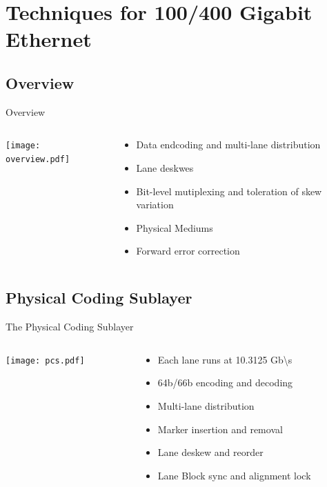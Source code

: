 \documentclass[fleqn,11pt,aspectratio=169]{beamer}
\begin{document}
\section{Techniques for 100/400 Gigabit Ethernet}
\subsection{Overview}
\begin{frame}{Overview}
\begin{columns} %
\begin{column}{.6\textwidth}
\texttt{[image: overview.pdf]}
\end{column}
\begin{column}{.4\textwidth}
\begin{itemize}
\item Data endcoding and multi-lane distribution
\item Lane deskwes
\item Bit-level mutiplexing and toleration of skew variation
\item Physical Mediums
\item Forward error correction
\end{itemize}
\end{column}
\end{columns}
\end{frame}

\subsection{Physical Coding Sublayer}
\begin{frame}{The Physical Coding Sublayer}
\begin{columns} %
\begin{column}{.6\textwidth}
\texttt{[image: pcs.pdf]}
\end{column}
\begin{column}{.4\textwidth}
\begin{itemize}
\item Each lane runs at 10.3125 Gb\textbackslash s
\item 64b/66b encoding and decoding
\item Multi-lane distribution
\item Marker insertion and removal
\item Lane deskew and reorder
\item Lane Block sync and alignment lock
\end{itemize}
\end{column}
\end{columns}
\end{frame}
\end{document}

